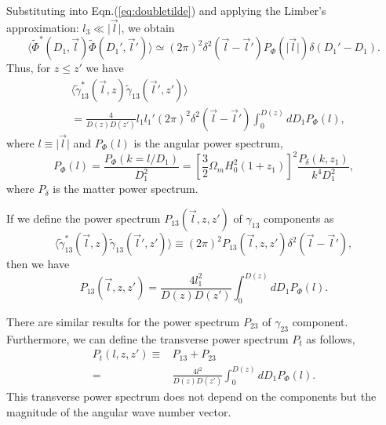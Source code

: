 \documentclass[aps,prd,twocolumn,floatfix,showpacs,superscriptaddress,nofootinbib]{revtex4-1}
\begin{document}
Substituting into Eqn.(\ref{eq:doubletilde}) and applying the Limber's approximation: $l_3\ll\vert\vec{l}\vert$, we obtain
\begin{equation}
\langle\tilde{\Phi}^*(D_1,\vec{l})\tilde{\Phi}(D_1',\vec{l}')\rangle\simeq(2\pi)^2\delta^2(\vec{l}-\vec{l}')P_{\Phi}(\vert\vec{l}\vert)\delta(D_1'-D_1).
\end{equation}
Thus, for $z\leq z'$ we have
\begin{align}
&\langle\tilde{\gamma}_{13}^*(\vec{l},z)\tilde{\gamma}_{13}(\vec{l}',z')\rangle\nonumber\\
&=\frac{4}{D(z)D(z')}l_1l_1'(2\pi)^2\delta^2(\vec{l}-\vec{l}')\int_0^{D(z)}dD_1P_{\Phi}(l),
\end{align}
where $l\equiv\vert\vec{l}\vert$ and $P_{\Phi}(l)$ is the angular power spectrum,
\begin{equation}
P_{\Phi}(l)=\frac{P_{\Phi}(k=l/D_1)}{D_1^2}=\left[\frac{3}{2}\Omega_mH_0^2(1+z_1)\right]^2\frac{P_{\delta}(k,z_1)}{k^4D_1^2},
\end{equation}
where $P_\delta$ is the matter power spectrum.

If we define the power spectrum $P_{13}(\vec{l},z,z')$ of $\gamma_{13}$ components as
\begin{equation}
\langle\tilde{\gamma}_{13}^*(\vec{l},z)\tilde{\gamma}_{13}(\vec{l}',z')\rangle\equiv(2\pi)^2P_{13}(\vec{l},z,z')\delta^2(\vec{l}-\vec{l}'),
\end{equation}
then we have
\begin{equation}
P_{13}(\vec{l},z,z')=\frac{4l_1^2}{D(z)D(z')}\int_0^{D(z)}dD_1P_{\Phi}(l).
\end{equation}

There are similar results for the power spectrum $P_{23}$ of $\gamma_{23}$ component. Furthermore, we can define the transverse power spectrum $P_t$ as follows,
\begin{align}
P_t(l,z,z')\equiv &P_{13}+P_{23}\nonumber\\
=&\frac{4l^2}{D(z)D(z')}\int_0^{D(z)}dD_1P_{\Phi}(l).
\end{align}
This transverse power spectrum does not depend on the components but the magnitude of the angular wave number vector.
\end{document}
